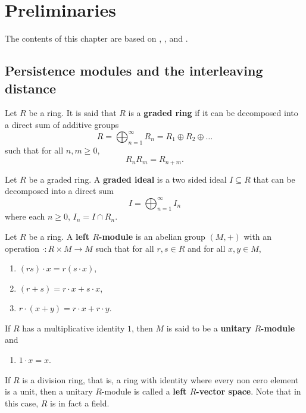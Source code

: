\chapter{Preliminaries}
The contents of this chapter are based on \cite{burago}, \cite{nanda}, \cite{polterovich} and \cite{wang}.

\section{Persistence modules and the interleaving distance}

\begin{definition}
    Let $ R $ be a ring. It is said that $ R $ is a {\bf graded ring} if it can be decomposed into a direct sum of additive groups
    $$
        R = \bigoplus_{n=1}^{\infty} R_n = R_1 \oplus R_2 \oplus \dots
    $$
    such that for all $ n, m \geq 0 $, 
    $$
        R_n R_m = R_{n+m}.
    $$
\end{definition}

\begin{definition}
    Let $ R $ be a graded ring. A {\bf graded ideal} is a two sided ideal $ I \subseteq R $ that can be decomposed into a direct sum
    $$
        I = \bigoplus_{n=1}^{\infty} I_n
    $$
    where each $n \geq 0 $, $ I_n = I \cap R_n $.
\end{definition}

\begin{definition}
    Let $ R $ be a ring. A {\bf left $R$-module } is an abelian group $ (M, +) $ with an operation $ \cdot \colon R \times M \to M $ such that for all $ r, s \in R $ and for all $ x, y \in M $,
    \begin{enumerate}
    \renewcommand{\labelenumi}{(\roman{enumi})}
        \item $ (rs) \cdot x = r (s \cdot x) $,
        \item $ (r + s) = r \cdot x + s \cdot x $,
        \item $ r \cdot (x + y) = r \cdot x + r \cdot y $.
    \end{enumerate}
    If $ R $ has a multiplicative identity $ 1 $, then $ M $ is said to be a {\bf unitary $R$-module} and 
    \begin{enumerate}
    \renewcommand{\labelenumi}{(\roman{enumi})}
        \setcounter{enumi}{3}
        \item $1 \cdot x = x $.
    \end{enumerate}
    If $ R $ is a division ring, that is, a ring with identity where every non cero element is a unit, then 
    a unitary $R$-module is called a {\bf left $R$-vector space}. Note that in this case, $R$ is in fact a field.
\end{definition}

